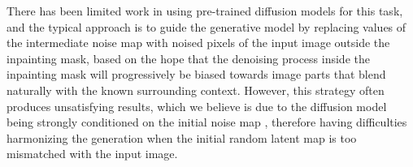 There has been limited work in using pre-trained diffusion models for this task, and 
the typical approach \cite{repaint, meng2022sdedit, glide} is to guide the generative 
model by replacing values of the intermediate noise map with noised pixels of the input 
image outside the inpainting mask, based on the hope that the denoising process inside 
the inpainting mask will progressively be biased towards image parts that blend 
naturally with the known surrounding context.
However, this strategy often produces unsatisfying results, which we believe is due to
 the diffusion model being strongly conditioned on the initial noise
  map \cite{optimaltransport}, therefore having difficulties harmonizing the generation
   when the initial random latent map is too mismatched with the input image.




